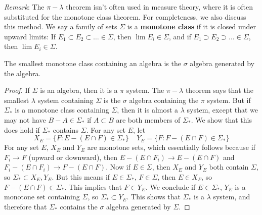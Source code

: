 {\it Remark}: The $\pi-\lambda$ theorem isn't often used in measure theory, where it is often substituted for the monotone class theorem. For completeness, we also discuss this method. We say a family of sets $\Sigma$ is a {\bf monotone class} if it is closed under upward limits: If $E_1 \subset E_2 \subset \dots \in \Sigma$, then $\lim E_i \in \Sigma$, and if $E_1 \supset E_2 \supset \dots \in \Sigma$, then $\lim E_i \in \Sigma$.

\begin{theorem}
    The smallest monotone class containing an algebra is the $\sigma$ algebra generated by the algebra.
\end{theorem}
\begin{proof}
    If $\Sigma$ is an algebra, then it is a $\pi$ system. The $\pi-\lambda$ theorem says that the smallest $\lambda$ system containing $\Sigma$ is the $\sigma$ algebra containing the $\pi$ system. But if $\Sigma_*$ is a monotone class containing $\Sigma$, then it is almost a $\lambda$ system, except that we may not have $B - A \in \Sigma_*$ if $A \subset B$ are both members of $\Sigma_*$. We show that this does hold if $\Sigma_*$ contains $\Sigma$. For any set $E$, let
    \[ X_E = \{ F: E - (E \cap F) \in \Sigma_* \}\ \ \ \ \ Y_E = \{ F: F - (E \cap F) \in \Sigma_* \} \]
    For any set $E$, $X_E$ and $Y_E$ are monotone sets, which essentially follows because if $F_i \to F$ (upward or downward), then $E - (E \cap F_i) \to E - (E \cap F)$ and $F_i - (E \cap F_i) \to F - (E \cap F)$. Now if $E \in \Sigma$, then $X_E$ and $Y_E$ both contain $\Sigma$, so $\Sigma_* \subset X_E, Y_E$. But this means if $E \in \Sigma_*$, $F \in \Sigma$, then $E \in X_F$, so $F - (E \cap F) \in \Sigma_*$. This implies that $F \in Y_E$. We conclude if $E \in \Sigma_*$, $Y_E$ is a monotone set containing $\Sigma$, so $\Sigma_* \subset Y_E$. This shows that $\Sigma_*$ is a $\lambda$ system, and therefore that $\Sigma_*$ contains the $\sigma$ algebra generated by $\Sigma$.
\end{proof}

